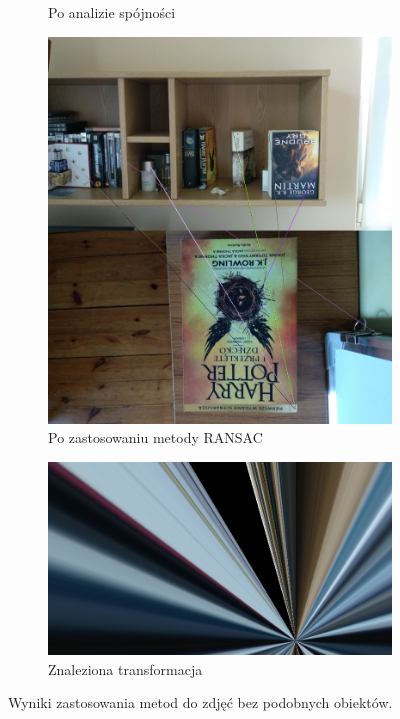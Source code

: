 \documentclass{article}
\begin{document}
\begin{figure}[H]
\begin{subfigure}[b]{0.4\linewidth}
			\caption{Po analizie spójności}
		\end{subfigure}
		\begin{subfigure}[b]{0.4\linewidth}
			\includegraphics[width=\linewidth]{falsem.png}
			\caption{Po zastosowaniu metody RANSAC}
		\end{subfigure}
		\begin{subfigure}[b]{0.6\linewidth}
			\includegraphics[width=\linewidth]{falset.png}
			\caption{Znaleziona transformacja}
		\end{subfigure}
		\caption{Wyniki zastosowania metod do zdjęć bez podobnych obiektów.}
		\label{fig:w3}
	\end{figure}
\end{document}
